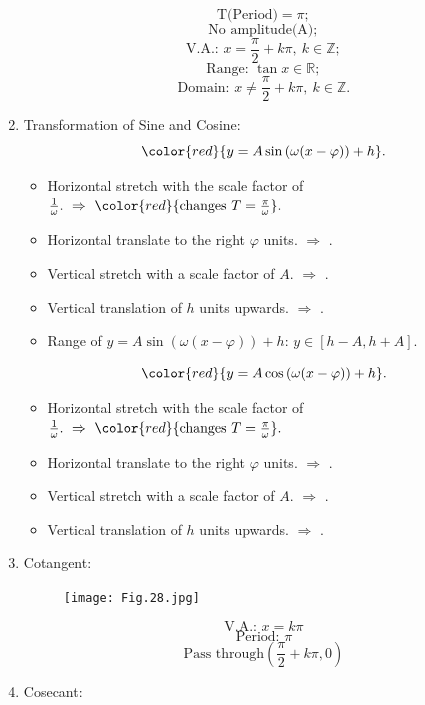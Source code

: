 \documentclass[12pt, a4paper]{article}
\def\Z{{\mathbb{Z}}}
\def\R{{\mathbb{R}}}
\begin{document}
\begin{enumerate}
\begin{figure}[H]
  \end{figure}
  $$\text{T(Period)}=\pi;$$
  $$\text{No amplitude(A)};$$
  $$\text{V.A.: }x=\frac{\pi}{2}+k\pi,\ k\in\Z;$$
  $$\text{Range: }\tan{x}\in\R;$$
  $$\text{Domain: }x\neq\frac{\pi}{2}+k\pi,\ k\in\Z.$$
  \item Transformation of Sine and Cosine: 
  $${\color{red}{y=A\sin{\left(\omega(x-\varphi)\right)}+h}}.$$
  \begin{itemize}
      \item Horizontal stretch with the scale factor of $\frac{1}{\omega}.\ \Rightarrow\ {\color{red}{\text{changes }T=\frac{\pi}{\omega}}}.$
      \item Horizontal translate to the right $\varphi$ units. $\Rightarrow$ {\color{red}{changes the initial point to $(\varphi, 0)$}}.
      \item Vertical stretch with a scale factor of $A$. $\Rightarrow$ {\color{red}{changes the amplitude$=|A|$}}. 
      \item Vertical translation of $h$ units upwards. $\Rightarrow$ {\color{red}{changes the equilibrium position $y=h$}}.
      \item Range of $y=A\sin{\left(\omega(x-\varphi)\right)}+h$: $y\in\left[h-A, h+A\right]$.
  \end{itemize}
  $${\color{red}{y=A\cos\left(\omega(x-\varphi)\right)+h}}.$$
  \begin{itemize}
    \item Horizontal stretch with the scale factor of $\frac{1}{\omega}.\ \Rightarrow\ {\color{red}{\text{changes }T=\frac{\pi}{\omega}}}.$
    \item Horizontal translate to the right $\varphi$ units. $\Rightarrow$ {\color{red}{changes the initial point to $(\varphi, 1)$}}.
    \item Vertical stretch with a scale factor of $A$. $\Rightarrow$ {\color{red}{changes the amplitude$=|A|$, initial point $(\varphi, A)$}}. 
    \item Vertical translation of $h$ units upwards. $\Rightarrow$ {\color{red}{changes the equilibrium position $y=h$, initial point $(\varphi, A+h)$}}.
  \end{itemize}
  \item Cotangent: 
  \begin{figure}[H]
    \centering
    \texttt{[image: Fig.28.jpg]}
  \end{figure}
  $$\text{V.A.: }x=k\pi$$
  $$\text{Period: }\pi$$
  $$\text{Pass through}\left(\frac{\pi}{2}+k\pi, 0\right)$$
  \item Cosecant: 

\end{enumerate}
\end{document}
